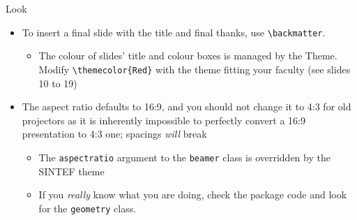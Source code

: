 \begin{frame}[fragile]{Look}
\begin{itemize}
    \item To insert a final slide with the title and final thanks, use \verb|\backmatter|.
    \begin{itemize}
        \item The colour of slides' title and colour boxes is managed by the Theme. Modify \verb|\themecolor{Red}| with the theme fitting your faculty (see slides 10 to 19)
    \end{itemize}
    \item The aspect ratio defaults to 16:9, and you should not change it to 4:3 for old projectors as it is inherently impossible to perfectly convert a 16:9 presentation to 4:3 one; spacings \emph{will} break
    \begin{itemize}    
        \item The \texttt{aspectratio} argument to the \texttt{beamer} class is overridden by the SINTEF theme
        \item If you \emph{really} know what you are doing, check the package code and look for the \texttt{geometry} class.
    \end{itemize}
\end{itemize}
\end{frame}